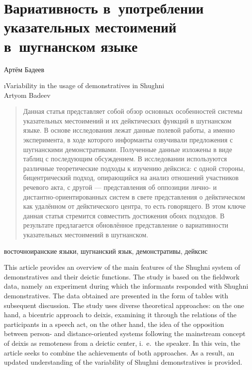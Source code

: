 ﻿\chapter*{Вариативность в~употреблении указательных местоимений\\в~шугнанском языке}
\setcounter{section}{0}
\label{chapter-badeev-demon}

\begin{customauthorname}
Артём Бадеев
\end{customauthorname}

\begin{englishtitle}
\i{Variability in the usage of demonstratives in Shughni\\{\small Artyom Badeev}}
\end{englishtitle}

\begin{abstract}
Данная статья представляет собой обзор основных особенностей системы указательных местоимений и их дейктических функций в шугнанском языке. В основе исследования лежат данные полевой работы, а именно эксперимента, в ходе которого информанты озвучивали предложения с шугнанскими демонстративами. Полученные данные изложены в виде таблиц с последующим обсуждением. В исследовании используются различные теоретические подходы к изучению дейксиса: с одной стороны, бицентрический подход, опирающийся на анализ отношений участников речевого акта, с другой — представления об оппозиции лично- и дистантно-ориентированных систем в свете представления о дейктическом как удалённом от дейктического центра, то есть говорящего. В этом ключе данная статья стремится совместить достижения обоих подходов. В результате предлагается обновлённое представление о вариативности указательных местоимений в шугнанском.
\end{abstract}

\begin{keywords}
восточноиранские языки, шугнанский язык, демонстративы, дейксис
\end{keywords}

\begin{eng-abstract}
This article provides an overview of the main features of the Shughni system of demonstratives and their deictic functions. The study is based on the fieldwork data, namely an experiment during which the informants responded with Shughni demonstratives. The data obtained are presented in the form of tables with subsequent discussion. The study uses diverse theoretical approaches: on the one hand, a bicentric approach to deixis, examining it through the relations of the participants in a speech act, on the other hand, the idea of the opposition between person- and distance-oriented systems following the mainstream concept of deixis as remoteness from a deictic center, i.~e.~the speaker. In this vein, the article seeks to combine the achievements of both approaches. As a result, an updated understanding of the variability of Shughni demonstratives is provided.
\end{eng-abstract}

